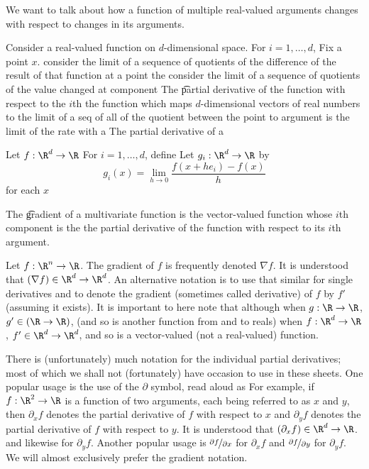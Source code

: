 

We want to talk about how a function
of multiple real-valued arguments
changes with respect to changes
in its arguments.


Consider a real-valued function on
$d$-dimensional space.
For $i = 1, \dots, d$,
Fix a point $x$.
consider the limit of a sequence
of quotients of the difference
of the result of that function
at a point
  the
consider the limit of a sequence of
quotients of the value changed at
component
The \t{partial derivative} of the
function with respect to the $i$th
the function which maps $d$-dimensional
vectors of real numbers to the limit
of a seq
of all of
the quotient between the point
to
argument is the limit of the rate
with a
The partial derivative of a


Let $f: \R^d \to \R$
For $i = 1,\dots,d$,
define
Let $g_i: \R^d \to \R$
by
\[
  g_i(x) = \lim_{h \to 0} \frac{f(x + he_i) - f(x)}{h}
\]
for each $x$




The \t{gradient} of a multivariate function is the vector-valued function whose $i$th component is the the partial derivative of the function with respect to its $i$th argument.


Let $f: \R^n \to \R$.
The gradient of $f$ is frequently denoted $\nabla f$.
It is understood that $(\nabla f) \in \R^d \to \R^d$.
An alternative notation is to use that similar for single derivatives and to denote the gradient (sometimes called derivative) of $f$ by $f'$ (assuming it exists).
It is important to here note that although when $g: \R \to \R$, $g' \in (\R \to \R)$, (and so is another function from and to reals) when $f: \R^d \to \R$, $f' \in \R^d \to \R^d$, and so is a vector-valued (not a real-valued) function.

There is (unfortunately) much notation for the individual partial derivatives; most of which we shall not (fortunately) have occasion to use in these sheets.
One popular usage is the use of the $\partial$ symbol, read aloud as 
For example, if $f: \R^2 \to \R$ is a function of two arguments, each being referred to as $x$ and $y$, then $\partial_x f$ denotes the partial derivative of $f$ with respect to $x$ and $\partial_y f$ denotes the partial derivative of $f$ with respect to $y$.
It is understood that $(\partial_x f) \in \R^d \to \R$. and likewise for $\partial_y f$.
Another popular usage is $\nicefrac{\partial f}{\partial x}$ for $\partial_x f$ and $\nicefrac{\partial f}{\partial y}$ for $\partial_y f$.
We will almost exclusively prefer the gradient notation.
